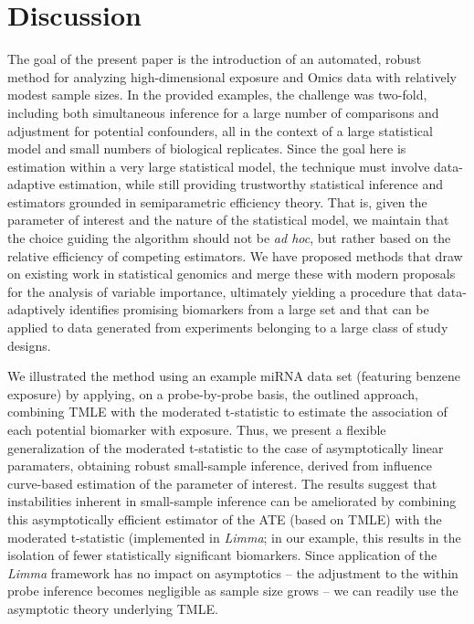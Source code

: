 \chapter{Discussion}

The goal of the present paper is the introduction of an automated, robust
method for analyzing high-dimensional exposure and Omics data with relatively
modest sample sizes. In the provided examples, the challenge was two-fold,
including both simultaneous inference for a large number of comparisons and
adjustment for potential confounders, all in the context of a large statistical
model and small numbers of biological replicates. Since the goal here is
estimation within a very large statistical model, the technique must involve
data-adaptive estimation, while still providing trustworthy statistical
inference and estimators grounded in semiparametric efficiency theory. That is,
given the parameter of interest and the nature of the statistical model, we
maintain that the choice guiding the algorithm should not be \textit{ad hoc},
but rather based on the relative efficiency of competing estimators. We have
proposed methods that draw on existing work in statistical genomics and merge
these with modern proposals for the analysis of variable importance, ultimately
yielding a procedure that data-adaptively identifies promising biomarkers from
a large set and that can be applied to data generated from experiments
belonging to a large class of study designs.

We illustrated the method using an example miRNA data set (featuring benzene
exposure) by applying, on a probe-by-probe basis, the outlined approach,
combining TMLE with the moderated t-statistic to estimate the association of
each potential biomarker with exposure. Thus, we present a flexible
generalization of the moderated t-statistic to the case of asymptotically
linear paramaters, obtaining robust small-sample inference, derived from
influence curve-based estimation of the parameter of interest. The results
suggest that instabilities inherent in small-sample inference can be
ameliorated by combining this asymptotically efficient estimator of the ATE
(based on TMLE) with the moderated t-statistic (implemented in {\em Limma}; in
our example, this results in the isolation of fewer statistically significant
biomarkers. Since application of the {\em Limma} framework has no impact on
asymptotics -- the adjustment to the within probe inference becomes negligible
as sample size grows -- we can readily use the asymptotic theory underlying
TMLE.

